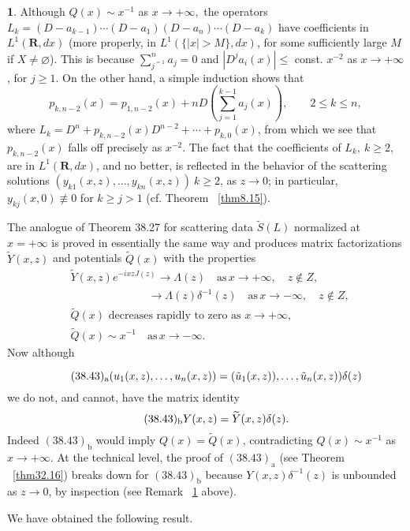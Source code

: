 \documentclass{surv-l}
\theoremstyle{plain}
\theoremstyle{definition}
\newtheorem{remark}[theorem]{\sc{Remark}}
\numberwithin{equation}{chapter}
\begin{document}
\setcounter{theorem}{40}
\begin{remark}\label{rem38.41}  Although $Q(x)\sim x^{-1}$ as $x\rightarrow+\infty,$ the operators $L_{k}= (D-a_{k-1})\cdots(D-a_{1})(D-a_{n})\cdots(D-a_{k})$ have coefficients in $L^{1}(\mathbf{R}, dx)$ (more properly, in $L^{1}(\{|x|>M\},dx)$, for some sufficiently large $M$ if $ X\neq\varnothing$). This is because $\sum_{j^{=1}}^{n}a_{j}=0$ and $|D^{j}a_{i}(x) |\leq$ const. $x^{-2}$ as $ x\rightarrow+\infty$, for $j\geq 1$. On the other hand, a simple induction shows that
\setcounter{equation}{41}
\begin{equation}\label{eq38.42}
p_{k,n-2}(x)=p_{1,n-2}(x)+nD\left(\sum_{j=1}^{k-1}a_{j}(x)\right),\qquad 2\leq k\leq n,
\end{equation}
where $L_{k}=D^{n}+p_{k,n-2}(x)D^{n-2}+\cdots+p_{k,0}(x)$, from which we see that $p_{k,n-2}(x)$ falls off precisely as $x^{-2}$. The fact that the coefficients of $L_{k},\ k\geq 2$, are in $L^{1}(\mathbf{R}, dx)$, and no better, is reflected in the behavior of the scattering solutions $(y_{k1}(x, z),\ldots,y_{kn}(x, z))\ k\geq 2$, as $z\rightarrow 0$; in particular, $y_{kj}(x, 0)\not\equiv 0$ for $ k\geq j>1$ (cf. Theorem ~\ref{thm8.15}).

The analogue of Theorem 38.27 for scattering data $\tilde{S}(L)$ normalized at $x= +\infty$ is proved in essentially the same way and produces matrix factorizations $\tilde{Y}(x, z)$ and potentials $\tilde{Q}(x)$ with the properties
\begin{align*}
&\tilde{Y}(x, z)e^{-ixzJ(z)}\rightarrow\Lambda(z)\quad \mathrm{as}\,  x\rightarrow+\infty,\quad z\not\in Z,\\
&\qquad\qquad\qquad\quad\rightarrow\Lambda(z)\delta^{-1}(z)\quad \mathrm{as}\,  x\rightarrow-\infty,\quad z\not\in Z,\\
&\tilde{Q}(x) \text{ decreases rapidly to zero as }  x\rightarrow+\infty,\\
&\tilde{Q}(x)\sim x^{-1}\quad \mathrm{as}\,  x\rightarrow-\infty.
\end{align*}
Now although

\begin{equation*}
\tag*{$(38.43)_{\mathrm{a}}$}(u_{1}(x, z),\ldots,u_{n}(x, z))=(\tilde{u}_{1}(x, z)),\ldots,\tilde{u}_{n}(x,z))\delta(z)
\end{equation*}
we do not, and cannot, have the matrix identity
\begin{equation*}
\tag*{$(38.43)_{\mathrm{b}}$} Y(x, z)=\widetilde{Y}(x, z)\delta(z).
\end{equation*}
Indeed $(38.43)_{\mathrm{b}}$ would imply $Q(x)=\tilde{Q}(x)$, contradicting $Q(x)\sim x^{-1}$ as $ x\rightarrow +\infty$. At the technical level, the proof of $(38.43)_{\mathrm{a}}$ (see Theorem ~\ref{thm32.16}) breaks down for $(38.43)_{\mathrm{b}}$ because $Y(x, z)\delta^{-1}(z)$ is unbounded as $z\rightarrow 0$, by inspection (see Remark ~\ref{rem38.41} above).

We have obtained the following result.
\end{remark}
\end{document}
